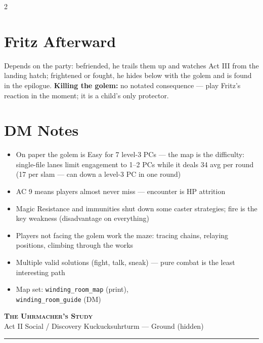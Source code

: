 \documentclass[10pt,letterpaper]{article}
\newcommand{\sceneheader}[4]{%
  \fancyhead[L]{\small\textcolor{accent}{\scshape #1}}%
  \fancyhead[R]{\small\textcolor{accent}{#2 \quad \textbullet \quad #3}}%
  \begin{center}
  {\LARGE\bfseries\scshape\textcolor{accent}{#1}}\\[2pt]
  {\small #2 \quad \textbullet \quad #3 \quad \textbullet \quad #4}\\[2pt]
  \textcolor{rulecol}{\rule{0.5\textwidth}{0.8pt}}
  \end{center}
  \vspace{-4pt}
}
\begin{document}
\begin{multicols}{2}
\section*{Fritz Afterward}
Depends on the party: befriended, he trails them up and watches Act III from the landing hatch; frightened or fought, he hides below with the golem and is found in the epilogue. \textbf{Killing the golem:} no notated consequence --- play Fritz's reaction in the moment; it is a child's only protector.

\section*{DM Notes}
\begin{itemize}
\item On paper the golem is Easy for 7 level-3 PCs --- the map is the difficulty: single-file lanes limit engagement to 1--2 PCs while it deals {\texttildelow}34 avg per round (17 per slam --- can down a level-3 PC in one round)
\item AC 9 means players almost never miss --- encounter is HP attrition
\item Magic Resistance and immunities shut down some caster strategies; fire is the key weakness (disadvantage on everything)
\item Players not facing the golem work the maze: tracing chains, relaying positions, climbing through the works
\item Multiple valid solutions (fight, talk, sneak) --- pure combat is the least interesting path
\item Map set: \texttt{winding\_room\_map} (print),\\ \texttt{winding\_room\_guide} (DM)
\end{itemize}

\end{multicols}

\newpage


\label{sec:study}\sceneheader{The Uhrmacher's Study}{Act II}{Social / Discovery}{Kuckucksuhrturm --- Ground (hidden)}
\end{document}
